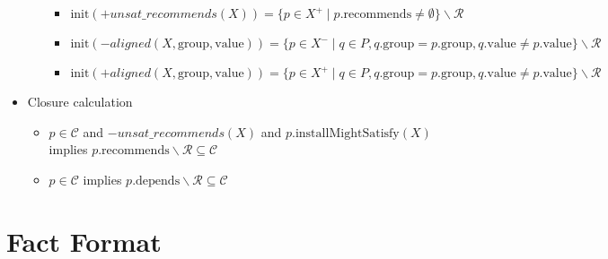 \documentclass[a4paper,english]{article}
\begin{document}
\begin{itemize}
\begin{itemize}
\begin{itemize}
          \item $\mathrm{init}({+}\mathit{unsat\_recommends}(X))=\{p\in X^{+}\mid p.\mathrm{recommends}\neq\emptyset\}\backslash\mathcal{R}$
          \item $\mathrm{init}({-}\mathit{aligned}(X,\mathrm{group},\mathrm{value}))=\{p\in X^{-}\mid q\in P, q.\mathrm{group} = p.\mathrm{group}, q.\mathrm{value} \neq p.\mathrm{value}\}\backslash\mathcal{R}$
          \item $\mathrm{init}({+}\mathit{aligned}(X,\mathrm{group},\mathrm{value}))=\{p\in X^{+}\mid q\in P, q.\mathrm{group} = p.\mathrm{group}, q.\mathrm{value} \neq p.\mathrm{value}\}\backslash\mathcal{R}$
        \end{itemize}
    \end{itemize}
  \item Closure calculation
    \begin{itemize}
      \item $p\in \mathcal{C}$ and ${-}\mathit{unsat\_recommends}(X)$ and $p.\mathrm{installMightSatisfy}(X)$ implies $p.\mathrm{recommends}\backslash\mathcal{R}\subseteq\mathcal{C}$
      \item $p\in \mathcal{C}$ implies $p.\mathrm{depends}\backslash\mathcal{R}\subseteq\mathcal{C}$
    \end{itemize}
\end{itemize}

\section{Fact Format}
\end{document}
